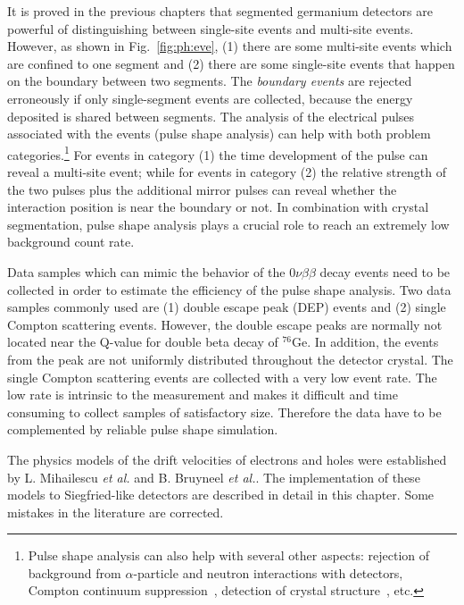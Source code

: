 It is proved in the previous chapters that segmented germanium detectors are powerful of distinguishing between single-site events and multi-site events. However, as shown in Fig.~\ref{fig:ph:eve}, (1) there are some multi-site events which are confined to one segment and (2) there are some single-site events that happen on the boundary between two segments. The \textit{boundary events} are rejected erroneously if only single-segment events are collected, because the energy deposited is shared between segments. The analysis of the electrical pulses associated with the events (pulse shape analysis) can help with both problem categories.\footnote{Pulse shape analysis can also help with several other aspects: rejection of background from $\alpha$-particle and neutron interactions with detectors, Compton continuum suppression~\cite{comcon}, detection of crystal structure~\cite{agata}, etc.} For events in category (1) the time development of the pulse can reveal a multi-site event; while for events in category (2) the relative strength of the two pulses plus the additional mirror pulses can reveal whether the interaction position is near the boundary or not.  In combination with crystal segmentation, pulse shape analysis plays a crucial role to reach an extremely low background count rate.

Data samples which can mimic the behavior of the $0\nu\beta\beta$ decay events need to be collected in order to estimate the efficiency of the pulse shape analysis. Two data samples commonly used are (1) double escape peak (DEP) events and (2) single Compton scattering events\cite{scoms}. However, the double escape peaks are normally not located near the Q-value for double beta decay of $^{76}$Ge. In addition, the events from the peak are not uniformly distributed throughout the detector crystal\cite{major}. The single Compton scattering events are collected with a very low event rate. The low rate is intrinsic to the measurement and makes it difficult and time consuming to collect samples of satisfactory size. Therefore the data have to be complemented by reliable pulse shape simulation.

The physics models of the drift velocities of electrons and holes were established by L. Mihailescu \textit{et al.}\cite{miha} and B. Bruyneel \emph{et al.}\cite{bart}. The implementation of these models to Siegfried-like detectors are described in detail in this chapter. Some mistakes in the literature\cite{miha} are corrected.


